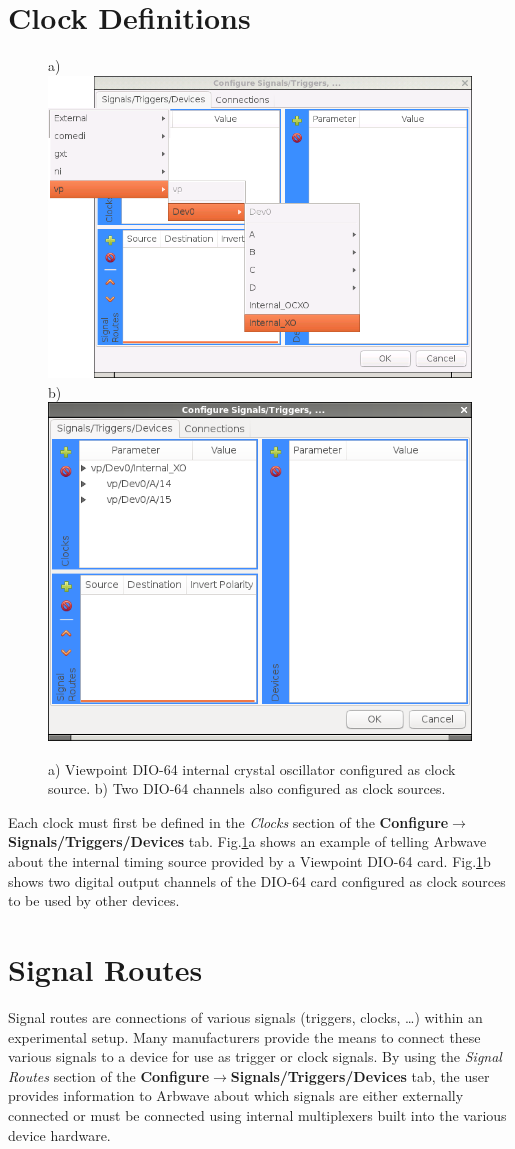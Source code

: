 \section{Clock Definitions}\label{sec:devcfg:clkdef}
\begin{figure}[ht!]
  \centerline{
    a) \includegraphics[width=.46\textwidth]{figures/add-clock-vp-XO}
    \hspace{.2em}
    b) \includegraphics[width=.46\textwidth]{figures/clocks-added}
  }
  \caption{
    a) Viewpoint DIO-64 internal crystal oscillator configured as clock source.
    b) Two DIO-64 channels also configured as clock sources.
  }
  \label{fig:devcfg:clocks-added}
\end{figure}
%
%
Each clock must first be defined in the \textit{Clocks} section of the
\textbf{Configure$\rightarrow$Signals/Triggers/Devices} tab.
Fig.\ref{fig:devcfg:clocks-added}a shows an example of telling Arbwave about the
internal timing source provided by a Viewpoint DIO-64 card.
Fig.\ref{fig:devcfg:clocks-added}b shows two digital output channels of the
DIO-64 card configured as clock sources to be used by other devices.



\section{Signal Routes}\label{sec:devcfg:routes}
Signal routes are connections of various signals (triggers, clocks, \ldots)
within an experimental setup.  Many manufacturers provide the means to
connect these various signals to a device for use as trigger or clock signals.  By
using the \textit{Signal Routes} section of the
\textbf{Configure$\rightarrow$Signals/Triggers/Devices} tab, the user provides
information to Arbwave about which signals are either externally connected or
must be connected using internal multiplexers built into the
various device hardware.

